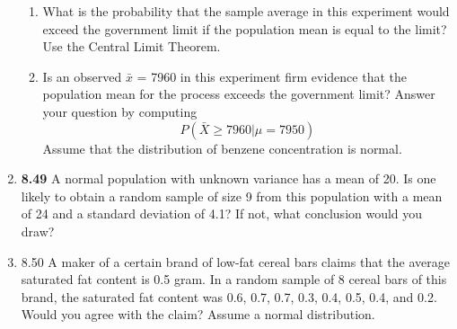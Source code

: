 \documentclass[basic, header]{nosvagor-notes}
\begin{document}
\begin{enumerate}[itemsep=4em]
\begin{enumerate}
      \item What is the probability that the sample average in this experiment
        would exceed the government limit if the population mean is equal to
        the limit? Use the Central Limit Theorem.

      \item Is an observed \(\bar{x}\) = 7960 in this experiment firm evidence
        that the population mean for the process exceeds the government limit?
        Answer your question by computing
        \[%
        P(\bar{X} \geq 7960 | \mu = 7950)
      \]%
      Assume that the distribution of benzene concentration is normal.

    \end{enumerate}

  \newpage %

  \item \textbf{8.49} A normal population with unknown variance has a mean of
    20. Is one likely to obtain a random sample of size 9 from this population
    with a mean of 24 and a standard deviation of 4.1? If not, what conclusion
    would you draw?

  \item 8.50 A maker of a certain brand of low-fat cereal bars claims that the
    average saturated fat content is 0.5 gram. In a random sample of 8 cereal
    bars of this brand, the saturated fat content was 0.6, 0.7, 0.7, 0.3, 0.4,
    0.5, 0.4, and 0.2. Would you agree with the claim? Assume a normal
    distribution.

\end{enumerate}
\end{document}
